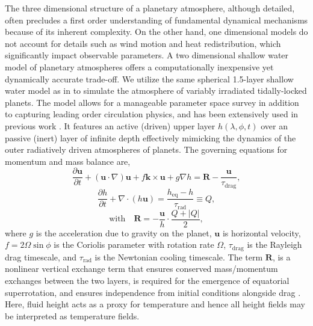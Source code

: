 \documentclass[trackchanges,twocolumn]{aastex7}
\begin{document}
The three dimensional structure of a planetary atmosphere, although detailed, often precludes a first order understanding of fundamental dynamical mechanisms because of its inherent complexity. On the other hand, one dimensional models do not account for details such as wind motion and heat redistribution, which significantly impact observable parameters. A two dimensional shallow water model of planetary atmospheres offers a computationally inexpensive yet dynamically accurate trade-off. We utilize the same spherical 1.5-layer shallow water model as in \cite{Banik2025} to simulate the atmosphere of variably irradiated tidally-locked planets. The model allows for a manageable parameter space survey in addition to capturing leading order circulation physics, and has been extensively used in previous work \citep{perez2013atmospheric,penn2017thermal, ohno2019atmospheres}. It features an active (driven) upper layer $h(\lambda, \phi, t)$ over an passive (inert) layer of infinite depth effectively mimicking the dynamics of the outer radiatively driven atmospheres of planets. The governing equations for momentum and mass balance are,
\begin{equation}
    \frac{\partial \mathbf{u}}{\partial t} + (\mathbf{u} \cdot \nabla) \mathbf{u} + f\mathbf{k} \times \mathbf{u} + g\nabla h = \textbf{R} - \frac{\mathbf{u}}{\tau_{\text{drag}}}, \label{eq:SW_mom}
\end{equation}
\begin{equation}
    \frac{\partial h}{\partial t} + \nabla \cdot (h\mathbf{u}) = \frac{h_{\text{eq}}-h}{\tau_{\text{rad}}} \equiv Q, \label{eq:SW_mass}
\end{equation}
\begin{equation}
   \text{with}\quad \textbf{R} = -\frac{\mathbf{u}}{h} \cdot\frac{Q+|Q|}{2},
\end{equation}
where $g$ is the acceleration due to gravity on the planet, $\mathbf{u}$ is horizontal velocity, $f = 2\Omega\sin\phi$ is the Coriolis parameter with rotation rate $\Omega$, $\tau_{\text{drag}}$ is the Rayleigh drag timescale, and $\tau_{\text{rad}}$ is the Newtonian cooling timescale. The term $\mathbf{R}$, is a nonlinear vertical exchange term that ensures conserved mass/momentum exchanges between the two layers, is required for the emergence of equatorial superrotation, and ensures independence from initial conditions alongside drag \citep{showman2010matsuno, showman2011equatorial, liu2013atmospheric}. Here, fluid height acts as a proxy for temperature and hence all height fields may be interpreted as temperature fields.
\end{document}
